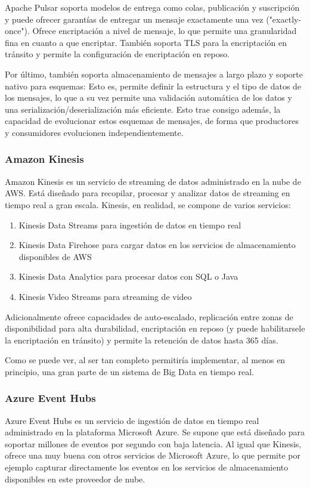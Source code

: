 Apache Pulsar soporta modelos de entrega como colas, publicación y suscripción y puede ofrecer garantías de entregar un mensaje 
exactamente una vez ("exactly-once"). Ofrece encriptación a nivel de mensaje, lo que permite una granularidad fina en cuanto a que encriptar. 
También soporta TLS para la encriptación en tránsito y permite la configuración de encriptación en reposo.
\newline

Por último, también soporta almacenamiento de mensajes a largo plazo y soporte nativo para esquemas:
Esto es, permite definir la estructura y el tipo de datos de los mensajes, lo que a su vez permite una validación automática de los datos 
y una serialización/deserialización más eficiente. Esto trae consigo además, la capacidad de evolucionar estos esquemas de mensajes,
de forma que productores y consumidores evolucionen independientemente.

\subsubsection{Amazon Kinesis}
Amazon Kinesis es un servicio de streaming de datos administrado en la nube de AWS. 
Está diseñado para recopilar, procesar y analizar datos de streaming en tiempo real a gran escala.
Kinesis, en realidad, se compone de varios servicios:
\begin{enumerate}
    \item Kinesis Data Streams para ingestión de datos en tiempo real
    \item Kinesis Data Firehose para cargar datos en los servicios de almacenamiento disponibles de AWS
    \item Kinesis Data Analytics para procesar datos con SQL o Java
    \item Kinesis Video Streams para streaming de video  
\end{enumerate}
Adicionalmente ofrece capacidades de auto-escalado, replicación entre zonas de disponibilidad para alta durabilidad, encriptación en reposo 
(y puede habilitarsele la encriptación en tránsito) y permite la retención de datos hasta 365 días.
\newline

Como se puede ver, al ser tan completo permitiría implementar, al menos en principio, una gran parte de un sistema de Big Data en tiempo real.

\subsubsection{Azure Event Hubs}
Azure Event Hubs es un servicio de ingestión de datos en tiempo real administrado en la plataforma Microsoft Azure.
Se supone que está diseñado para soportar millones de eventos por segundo con baja latencia. Al igual que Kinesis,
ofrece una muy buena con otros servicios de Microsoft Azure, lo que permite por ejemplo capturar directamente los eventos
en los servicios de almacenamiento disponibles en este proveedor de nube.\newline

